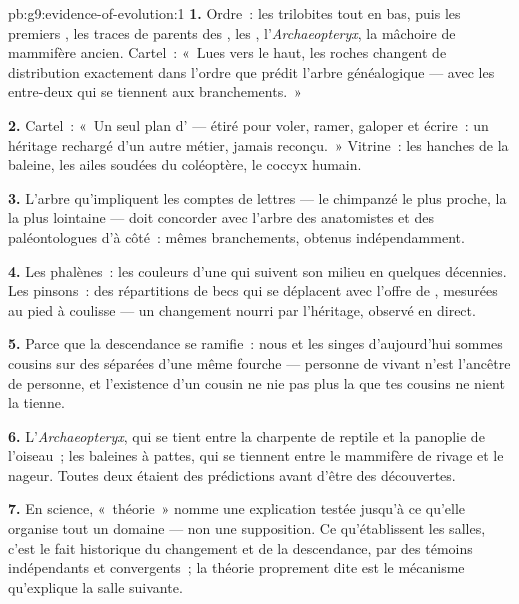 \begin{solution}{pb:g9:evidence-of-evolution:1}
\textbf{1.} Ordre~: les trilobites tout en bas, puis les
premiers , les traces de parents des , les
, l'\emph{Archaeopteryx}, la mâchoire de mammifère
ancien. Cartel~: «~Lues vers le haut, les roches changent de
distribution exactement dans l'ordre que prédit l'arbre
généalogique --- avec les entre-deux qui se tiennent aux
branchements.~»

\textbf{2.} Cartel~: «~Un seul plan d' --- étiré pour
voler, ramer, galoper et écrire~: un héritage rechargé d'un
autre métier, jamais reconçu.~» Vitrine~: les hanches de la
baleine, les ailes soudées du coléoptère, le coccyx humain.

\textbf{3.} L'arbre qu'impliquent les comptes de lettres ---
le chimpanzé le plus proche, la  la plus lointaine ---
doit concorder avec l'arbre des anatomistes et des
paléontologues d'à côté~: mêmes branchements, obtenus
indépendamment.

\textbf{4.} Les phalènes~: les couleurs d'une  qui
suivent son milieu en quelques décennies. Les pinsons~: des
répartitions de becs qui se déplacent avec l'offre de
, mesurées au pied à coulisse --- un changement
nourri par l'héritage, observé en direct.

\textbf{5.} Parce que la descendance se ramifie~: nous et
les singes d'aujourd'hui sommes cousins sur des 
séparées d'une même fourche --- personne de vivant n'est
l'ancêtre de personne, et l'existence d'un cousin ne nie pas
plus la  que tes cousins ne nient la tienne.

\textbf{6.} L'\emph{Archaeopteryx}, qui se tient entre la
charpente de reptile et la panoplie de l'oiseau~; les
baleines  à pattes, qui se tiennent entre le
mammifère de rivage et le nageur. Toutes deux étaient des
prédictions avant d'être des découvertes.

\textbf{7.} En science, «~théorie~» nomme une explication
testée jusqu'à ce qu'elle organise tout un domaine --- non
une supposition. Ce qu'établissent les salles, c'est le fait
historique du changement et de la descendance, par des
témoins indépendants et convergents~; la théorie proprement
dite est le mécanisme qu'explique la salle suivante.


\end{solution}
